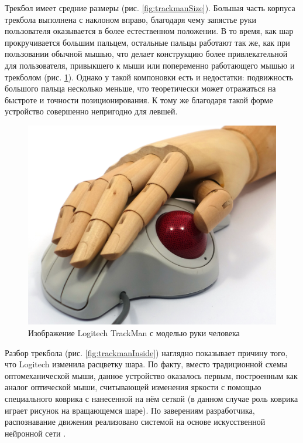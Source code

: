 \documentclass[11pt, a4paper]{article}
\begin{document}
Трекбол имеет средние размеры (рис. \ref{fig:trackmanSize}). Большая часть корпуса трекбола выполнена с наклоном вправо, благодаря чему запястье руки пользователя оказывается в более естественном положении. В то время, как шар прокручивается большим пальцем, остальные пальцы работают так же, как при пользовании обычной мышью, что делает конструкцию более привлекательной для пользователя, привыкшего к мыши или попеременно работающего мышью и трекболом (рис. \ref{fig:trackmanHand}). Однако у такой компоновки есть и недостатки: подвижность большого пальца несколько меньше, что теоретически может отражаться на быстроте и точности позиционирования. К тому же благодаря такой форме устройство совершенно непригодно для левшей.

\begin{figure}[h]
    \centering
    \includegraphics[scale=0.6]{1995_logitech_trackman/hand_30.jpg}
    \caption{Изображение Logitech TrackMan с моделью руки человека}
    \label{fig:trackmanHand}
\end{figure}

Разбор трекбола (рис. \ref{fig:trackmanInside}) наглядно показывает причину того, что Logitech изменила расцветку шара. По факту, вместо традиционной схемы оптомеханической мыши, данное устройство оказалось первым, построенным как аналог оптической мыши, считывающей изменения яркости с помощью специального коврика с нанесенной на нём сеткой (в данном случае роль коврика играет рисунок на вращающемся шаре). По заверениям разработчика, распознавание движения реализовано системой на основе искусственной нейронной сети \cite{marbleAdv}.
\end{document}
